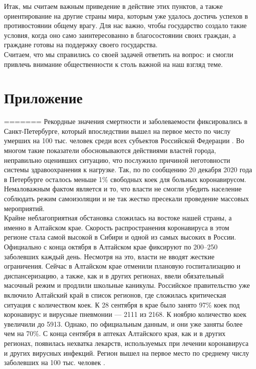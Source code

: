 \documentclass[a4paper, 12pt]{extarticle}
\begin{document}
Итак, мы считаем важным приведение в действие этих пунктов, а также
ориентирование на другие страны мира, которым уже удалось достичь успехов в
противостоянии общему врагу. Для нас важно, чтобы государство создало такие
условия, когда оно само заинтересованно в благосостоянии своих граждан, а
граждане готовы на поддержку своего государства.
\\

Считаем, что мы справились со своей задачей ответить на вопрос:  и
смогли привлечь внимание общественности к столь важной на наш взгляд теме.

\newpage
\section{Приложение}
\newpage
=======
Рекордные значения смертности и заболеваемости фиксировались в Санкт-Петербурге, который впоследствии вышел на первое место по числу умерших на 100 тыс. человек среди всех субъектов Российской Федерации . Во многом такие показатели обосновываются действиями властей города, неправильно оценивших ситуацию, что послужило причиной неготовности системы здравоохранения к нагрузке. Так, по по сообщению 20 декабря 2020 года в Петербурге осталось меньше 1\% свободных коек для больных коронавирусом. Немаловажным фактом является и то, что власти не смогли убедить население соблюдать режим самоизоляции и не так жестко пресекали проведение массовых мероприятий.
\\

Крайне неблагоприятная обстановка сложилась на востоке нашей страны, а именно в Алтайском крае. Скорость распространения коронавируса в этом регионе стала самой высокой в Сибири и одной из самых высоких в России. Официально с конца октября в Алтайском крае фиксируют по 200–250 заболевших каждый день. Несмотря на это, власти не вводят жесткие ограничения. Сейчас в Алтайском крае отменили плановую госпитализацию и диспансеризацию, а также, как и в других регионах, ввели обязательный масочный режим и продлили школьные каникулы. Российское правительство уже включило Алтайский край в список регионов, где сложилась критическая ситуация с количеством коек. К 28 сентября в крае было занято 97\% коек под коронавирус и вирусные пневмонии — 2111 из 2168. К ноябрю количество коек увеличили до 5913. Однако, по официальным данным, и они уже заняты более чем на 70\%. С конца сентября в аптеках Алтайского края, как и в других регионах, появилась нехватка лекарств, используемых при лечении коронавируса и других вирусных инфекций. Регион вышел на первое место по среднему числу заболевших на 100 тыс. человек .
\end{document}
